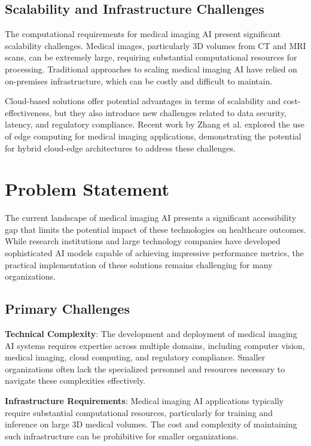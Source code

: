 \documentclass[12pt,a4paper]{article}
\begin{document}
\subsection{Scalability and Infrastructure Challenges}

The computational requirements for medical imaging AI present significant scalability challenges. Medical images, particularly 3D volumes from CT and MRI scans, can be extremely large, requiring substantial computational resources for processing. Traditional approaches to scaling medical imaging AI have relied on on-premises infrastructure, which can be costly and difficult to maintain.

Cloud-based solutions offer potential advantages in terms of scalability and cost-effectiveness, but they also introduce new challenges related to data security, latency, and regulatory compliance. Recent work by Zhang et al. \cite{zhang2020medical} explored the use of edge computing for medical imaging applications, demonstrating the potential for hybrid cloud-edge architectures to address these challenges.

\section{Problem Statement}

The current landscape of medical imaging AI presents a significant accessibility gap that limits the potential impact of these technologies on healthcare outcomes. While research institutions and large technology companies have developed sophisticated AI models capable of achieving impressive performance metrics, the practical implementation of these solutions remains challenging for many organizations.

\subsection{Primary Challenges}

\textbf{Technical Complexity}: The development and deployment of medical imaging AI systems requires expertise across multiple domains, including computer vision, medical imaging, cloud computing, and regulatory compliance. Smaller organizations often lack the specialized personnel and resources necessary to navigate these complexities effectively.

\textbf{Infrastructure Requirements}: Medical imaging AI applications typically require substantial computational resources, particularly for training and inference on large 3D medical volumes. The cost and complexity of maintaining such infrastructure can be prohibitive for smaller organizations.
\end{document}
